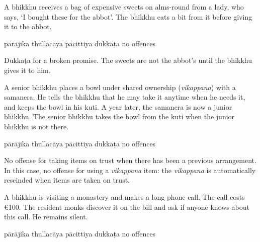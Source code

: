 \begin{exam}{\autoExamName}
\begin{problem*}
\begin{parts}
  \bigskip

  \item A bhikkhu receives a bag of expensive sweets on alms-round from a lady, who
  says, `I bought these for the abbot'. The bhikkhu eats a bit from it before giving it
  to the abbot.

  \bigskip

  \begin{answers}{5}
    \bChoices
     pārājika\eAns
     thullacāya\eAns
     pācittiya\eAns
     dukkaṭa\eAns
     no offences\eAns
    \eChoices
  \end{answers}

  \begin{solution}
    Dukkaṭa for a broken promise. The sweets are not the abbot's until the
    bhikkhu gives it to him.
  \end{solution}

  \bigskip

  \item A senior bhikkhu places a bowl under shared ownership (\emph{vikappana}) with a samanera.
  He tells the bhikkhu that he may take it anytime when he needs it, and keeps the bowl in his kuti.
  A year later, the samanera is now a junior bhikkhu.
  The senior bhikkhu takes the bowl from the kuti when the junior bhikkhu is not there.

  \bigskip

  \begin{answers}{5}
    \bChoices
     pārājika\eAns
     thullacāya\eAns
     pācittiya\eAns
     dukkaṭa\eAns
     no offences\eAns
    \eChoices
  \end{answers}

  \begin{solution}
    No offense for taking items on trust when there has been a previous
    arrangement. In this case, no offense for using a \textit{vikappana} item:
    the \emph{vikappana} is automatically rescinded when items are taken on
    trust.
  \end{solution}

  \item A bhikkhu is visiting a monastery and makes a long phone call. The call
  costs €100. The resident monks discover it on the bill and ask if
  anyone knows about this call. He remains silent.

  \bigskip

  \begin{answers}{5}
    \bChoices
     pārājika\eAns
     thullacāya\eAns
     pācittiya\eAns
     dukkaṭa\eAns
     no offences\eAns
    \eChoices
  \end{answers}


\end{parts}
\end{problem*}
\end{exam}
